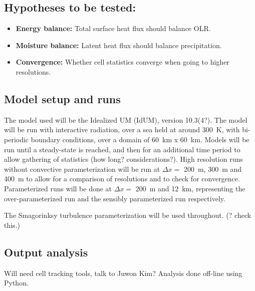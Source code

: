 \documentclass{article}
\begin{document}
\subsection*{Hypotheses to be tested:}

\begin{itemize}
    \item \textbf{Energy balance:} Total surface heat flux should balance OLR.
    \item \textbf{Moisture balance:} Latent heat flux should balance precipitation.
    \item \textbf{Convergence:} Whether cell statistics converge when going to higher resolutions.
\end{itemize}

\subsection*{Model setup and runs}

The model used will be the Idealized UM (IdUM), version 10.3(4?). The model will be run with
interactive radiation, over a sea held at around \SI{300}{K}, with bi-periodic boundary conditions,
over a domain of \SI{60}{km} x \SI{60}{km}. Models will be run until a steady-state is reached, and
then for an additional time period to allow gathering of statistics (how long? considerations?).
High resolution runs without convective parameterization will be run at $\Delta x = $ \SI{200}{m},
\SI{300}{m} and \SI{400}{m} to allow for a comparison of resolutions and to check for convergence.
Parameterized runs will be done at $\Delta x = $ \SI{200}{m} and \SI{12}{km}, representing the
over-parameterized run and the sensibly parameterized run respectively. 

The Smagorinksy turbulence parameterization will be used throughout. (? check this.)

\subsection*{Output analysis}

Will need cell tracking tools, talk to Juwon Kim? Analysis done off-line using Python. 
\end{document}
